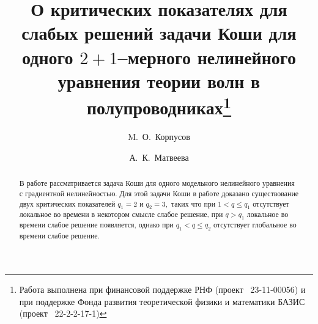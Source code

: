 \usepackage{todonotes}

\usepackage[russian]{nla}


\fi

\title{О критических показателях для слабых решений задачи Коши для одного $2+1$--мерного нелинейного уравнения теории волн в полупроводниках\thanks{Работа выполнена при финансовой поддержке РНФ (проект \textnumero~23-11-00056) и при поддержке  Фонда развития теоретической физики и математики БАЗИС  (проект \textnumero~22-2-2-17-1)}}
\author{M.~О.~Корпусов \and А.~К.~Матвеева
}


\maketitle

\begin{abstract}
В работе рассматривается задача Коши для одного модельного нелинейного уравнения с градиентной нелинейностью.
Для этой задачи Коши в работе доказано существование двух критических показателей $q_1=2$ и $q_2=3,$ таких что при $1<q\leqslant q_1$ отсутствует локальное во времени в некотором смысле слабое решение, при $q>q_1$ локальное во времени слабое решение появляется, однако при $q_1<q\leqslant q_2$ отсутствует глобальное во времени слабое решение.

\end{abstract}

